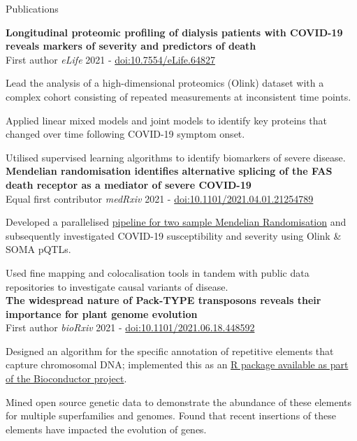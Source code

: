 \documentclass{resume}
\begin{document}
\begin{rSection}{Publications}

\vspace{1pt plus 1pt}
\textbf{Longitudinal proteomic profiling of dialysis patients with COVID-19 reveals markers of severity and predictors of death} \\
First author \hfill  \textit{eLife} 2021 - \href{https://doi.org/10.7554/eLife.64827}{doi:10.7554/eLife.64827}

\vspace{2pt plus 1pt minus 1pt}
\item Lead the analysis of a high-dimensional proteomics (Olink) dataset with a complex cohort consisting of repeated measurements at inconsistent time points.
\item Applied linear mixed models and joint models to identify key proteins that changed over time following COVID-19 symptom onset.
\item Utilised supervised learning algorithms to identify biomarkers of severe disease.\\

\textbf{Mendelian randomisation identifies alternative splicing of the FAS death receptor as a mediator of severe COVID-19} \\
Equal first contributor \hfill  \textit{medRxiv} 2021 - \href{https://doi.org/10.1101/2021.04.01.21254789}{doi:10.1101/2021.04.01.21254789}

\vspace{2pt plus 1pt minus 1pt}
\item Developed a parallelised \href{https://github.com/jackgisby/mr-nextflow}{pipeline for two sample Mendelian Randomisation} and subsequently investigated COVID-19 susceptibility and severity using Olink \& SOMA pQTLs. 
\item Used fine mapping and colocalisation tools in tandem with public data repositories to investigate causal variants of disease. \\

\textbf{The widespread nature of Pack-TYPE transposons reveals their importance for plant genome evolution} \\
First author \hfill  \textit{bioRxiv} 2021 - \href{https://doi.org/10.1101/2021.06.18.448592}{doi:10.1101/2021.06.18.448592}

\vspace{2pt plus 1pt minus 1pt}
\item Designed an algorithm for the specific annotation of repetitive elements that capture chromosomal DNA; implemented this as an \href{https://bioconductor.org/packages/release/bioc/html/packFinder.html}{R package available as part of the Bioconductor project}.
\item Mined open source genetic data to demonstrate the abundance of these elements for multiple superfamilies and genomes. Found that recent insertions of these elements have impacted the evolution of genes. \\


\end{rSection}
\end{document}
